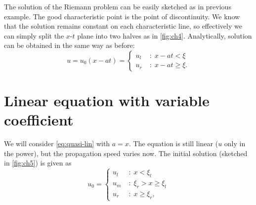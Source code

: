 \documentclass[justified, nobib, a4page]{tufte-handout}
\begin{document}
The solution of the Riemann problem can be easily sketched as in previous example.
The good characteristic point is the point of discontinuity. We know that the 
solution remains constant on each characteristic line, so effectively we can 
simply split the \(x\)-\(t\) plane into two halves as in \cref{fig:ch4}.
Analytically, solution can be obtained in the same way as before:
\[
  u = u_0(x-at) = 
  \left\{
  \begin{aligned}
   u_l \; &: \; x - at < \xi\\
   u_r \; &: \; x - at \geq \xi.
  \end{aligned} \right.
\]

\begin{marginfigure}
  \begin{center}
  \end{center}
  \caption{Solution to the Riemann problem example.}\label{fig:ch4}
\end{marginfigure}

\section{Linear equation with variable coefficient}
We will consider \cref{eq:quasi-lin} with \(a = x\). The equation is still
linear (\(u\) only in the  power), but the propagation speed varies now.
The initial solution (sketched in \cref{fig:ch5}) is given as 
\[
u_0 = \left\{
\begin{aligned}
 u_l \; &: \; x < \xi_l\\
 u_m \; &: \; \xi_r > x \geq \xi_l\\
 u_r \; &: \; x \geq \xi_r,
\end{aligned} \right.
\]
\end{document}
